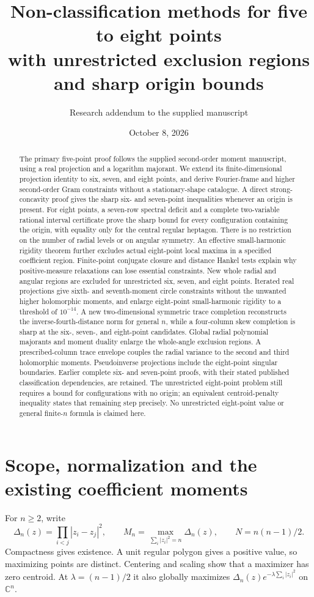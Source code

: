 \documentclass[11pt]{article}
\title{Non-classification methods for five to eight points\\with unrestricted exclusion regions and sharp origin bounds}
\author{Research addendum to the supplied manuscript}
\date{October 8, 2026}
\theoremstyle{remark}
\newcommand{\C}{\mathbb C}
\numberwithin{equation}{section}
\begin{document}
\maketitle
\begin{abstract}
The primary five-point proof follows the supplied second-order moment
manuscript, using a real projection and a logarithm majorant. We extend
its finite-dimensional projection identity to six, seven, and eight
points, and derive Fourier-frame and higher second-order Gram constraints
without a stationary-shape catalogue. A direct strong-concavity proof
gives the sharp six- and seven-point inequalities whenever an origin
is present. For eight points, a seven-row spectral deficit and a complete
two-variable rational interval certificate prove the sharp bound for
every configuration containing the origin, with equality only for the
central regular heptagon. There is no restriction on the number of
radial levels or on angular symmetry. An effective small-harmonic
rigidity theorem further excludes actual eight-point local maxima in
a specified coefficient region. Finite-point conjugate closure and
distance Hankel tests explain why positive-measure relaxations can lose
essential constraints. New whole radial and angular regions are excluded
for unrestricted six, seven, and eight points. Iterated real projections
give sixth- and seventh-moment circle constraints without the unwanted
higher holomorphic moments, and enlarge eight-point small-harmonic
rigidity to a threshold of $10^{-14}$.
A new two-dimensional symmetric trace completion reconstructs the
inverse-fourth-distance norm for general $n$, while a four-column
skew completion is sharp at the six-, seven-, and eight-point candidates.
Global radial polynomial majorants and moment duality enlarge the
whole-angle exclusion regions. A prescribed-column trace envelope
couples the radial variance to the second and third holomorphic moments.
Pseudoinverse projections include the eight-point singular boundaries.
Earlier complete six- and seven-point proofs,
with their stated published classification dependencies, are retained.
The unrestricted eight-point problem still requires a bound for
configurations with no origin; an equivalent centroid-penalty inequality
states that remaining step precisely. No unrestricted eight-point
value or general finite-$n$ formula is claimed here.
\end{abstract}

\section{Scope, normalization and the existing coefficient moments}
For $n\ge2$, write
\[
\Delta_n(z)=\prod_{i<j}|z_i-z_j|^2,\qquad
M_n=\max_{\sum_i|z_i|^2=n}\Delta_n(z),\qquad N=n(n-1)/2.
\]
Compactness gives existence. A unit regular polygon gives a positive
value, so maximizing points are distinct. Centering and scaling show
that a maximizer has zero centroid. At $\lambda=(n-1)/2$ it also
globally maximizes $\Delta_n(z)e^{-\lambda\sum_i|z_i|^2}$ on $\C^n$.
\end{document}
